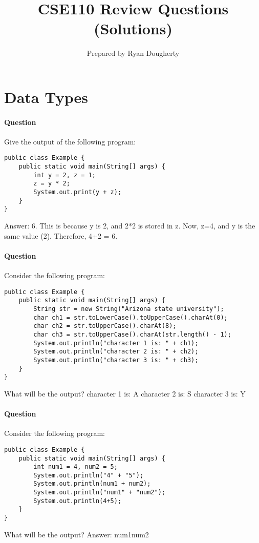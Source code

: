 \documentclass{article}
\title{CSE110 Review Questions (Solutions)}
\author{Prepared by Ryan Dougherty}
\date{}
\begin{document}
\maketitle

\setcounter{question_num}{1}

\section{Data Types}

\setcounter{question_num}{1}
\paragraph{Question }
Give the output of the following program:
\begin{lstlisting}
public class Example {
	public static void main(String[] args) {
		int y = 2, z = 1;
		z = y * 2;
		System.out.print(y + z);
	}
}
\end{lstlisting}
{\color{red}Answer: 6. This is because y is 2, and 2*2 is stored in z. Now, z=4, and y is the same value (2). Therefore, 4+2 = 6.}

\addtocounter{question_num}{1}
\paragraph{Question }
Consider the following program:
\begin{lstlisting}
public class Example {
	public static void main(String[] args) {
		String str = new String("Arizona state university");
		char ch1 = str.toLowerCase().toUpperCase().charAt(0);
		char ch2 = str.toUpperCase().charAt(8);
		char ch3 = str.toUpperCase().charAt(str.length() - 1);
		System.out.println("character 1 is: " + ch1);
		System.out.println("character 2 is: " + ch2);
		System.out.println("character 3 is: " + ch3);
	}
}
\end{lstlisting}
What will be the output?
\newline
{\color{red}character 1 is: A
\newline character 2 is: S
\newline character 3 is: Y}

\addtocounter{question_num}{1}
\paragraph{Question }
Consider the following program:
\begin{lstlisting}
public class Example {
	public static void main(String[] args) {
		int num1 = 4, num2 = 5;
		System.out.println("4" + "5");
		System.out.println(num1 + num2);
		System.out.println("num1" + "num2");
		System.out.println(4+5);
	}
}
\end{lstlisting}
What will be the output?
\newline
{\color{red}Answer:
\newline num1num2
}
\end{document}
